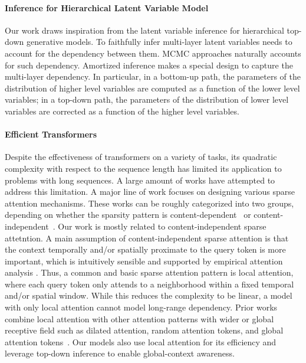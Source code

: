 \paragraph{Inference for Hierarchical Latent Variable Model}
Our work draws inspiration from the latent variable inference for hierarchical top-down generative models. To faithfully infer multi-layer latent variables needs to account for the dependency between them. MCMC approaches \cite{nijkamp2020learning} naturally accounts for such dependency. Amortized inference \cite{sonderby2016ladder, maaloe2019biva, child2020very} makes a special design to capture the multi-layer dependency. In particular, in a bottom-up path, the parameters of the distribution of higher level variables are computed as a function of the lower level variables; in a top-down path, the parameters of the distribution of lower level variables are corrected as a function of the higher level variables.  

\paragraph{Efficient Transformers}
Despite the effectiveness of transformers on a variety of tasks, its quadratic complexity with respect to the sequence length has limited its application to problems with long sequences. A large amount of works have attempted to address this limitation. A major line of work focuses on designing various sparse attention mechanisms. These works can be roughly categorized into two groups, depending on whether the sparsity pattern is content-dependent~\citep{kitaev2020reformer, roy-etal-2021-efficient, wang-etal-2021-cluster} or content-independent~\citep{Child2019GeneratingLS, beltagy2020longformer, ainslie-etal-2020-etc, zaheer2020big}. Our work is mostly related to content-independent sparse attetntion. A main assumption of content-independent sparse attention is that the context temporally and/or spatially proximate to the query token is more important, which is intuitively sensible and supported by empirical attention analysis \citep{Child2019GeneratingLS}. Thus, a common and basic sparse attention pattern is local attention, where each query token only attends to a neighborhood within a fixed temporal and/or spatial window. While this reduces the complexity to be linear, a model with only local attention cannot model long-range dependency. Prior works combine local attention with other attention patterns with wider or global receptive field such as dilated attention, random attention tokens, and global attention tokens~\citep{beltagy2020longformer, zaheer2020big}. Our models also use local attention for its efficiency and leverage top-down inference to enable global-context awareness. 

